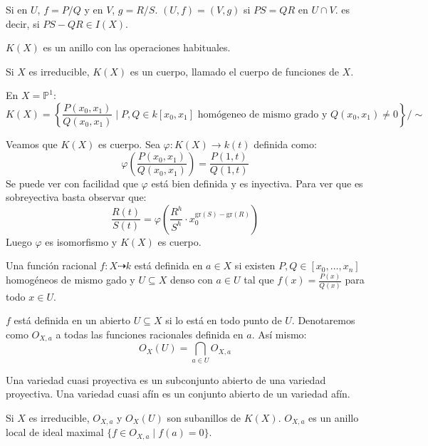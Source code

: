 \documentclass[ACGA.tex]{subfiles}
\begin{document}
\begin{nota}
Si en $U$, $f=P/Q$ y en $V$, $g=R/S$. $(U,f)=(V,g)$ si  $PS=QR$ en $U \cap V$. es decir, si $PS-QR\in I(X)$.
\end{nota}

\begin{prop}
$K(X)$ es un anillo con las operaciones habituales.
\end{prop}

\begin{prop}
Si $X$ es irreducible, $K(X)$ es un cuerpo, llamado el cuerpo de funciones de $X$.
\end{prop}

\begin{ej}
En $X=\mathbb{P}^1$:
\[ K(X) = \left\{\frac{P(x_0,x_1)}{Q(x_0,x_1)} \mid P,Q \in k[x_0,x_1] \text{ homógeneo de mismo grado y }Q(x_0,x_1)\neq 0\right\} / \sim \]

Veamos que $K(X)$ es cuerpo. Sea $φ : K(X) \to k(t)$ definida como:
\[ φ\left(\frac{P(x_0,x_1)}{Q(x_0,x_1)}\right)  = \frac{P(1,t)}{Q(1,t)} \]
Se puede ver con facilidad que $φ$ está bien definida y es inyectiva. Para ver que es sobreyectiva basta observar que:
\[ \frac{R(t)}{S(t)} = φ \left(\frac{R^h}{S^h} \cdot x_0^{\text{gr}(S)-\text{gr}(R)} \right)\]
Luego $φ$ es isomorfismo y $K(X)$ es cuerpo.
\end{ej}

\begin{defi}
Una función racional $f : X \dashrightarrow k$ está definida en $a \in X$ si existen $P,Q \in [x_0,\dots,x_n]$ homogéneos de mismo gado y $U \subseteq X$ denso con $a \in U$ tal que $f(x) = \frac{P(x)}{Q(x)}$ para todo $x \in U$.
\end{defi}

\begin{defi}
$f$ está definida en un abierto $U \subseteq X$ si lo está en todo punto de $U$. Denotaremos como $O_{X,a}$ a todas las funciones racionales definida en $a$. Así mismo:
\[ O_X(U) = \bigcap_{a \in U} O_{X,a} \]
\end{defi}
\begin{defi} Una variedad cuasi proyectiva es un subconjunto abierto de una variedad proyectiva. Una variedad cuasi afín es un conjunto abierto de un variedad afín.
\end{defi}
\begin{prop}
Si $X$ es irreducible, $O_{X,a}$ y $O_X(U)$ son subanillos de $K(X)$. $O_{X,a}$ es un anillo local de ideal maximal $\{f \in O_{X,a} \mid f(a)=0\}$.
\end{prop}
\end{document}
